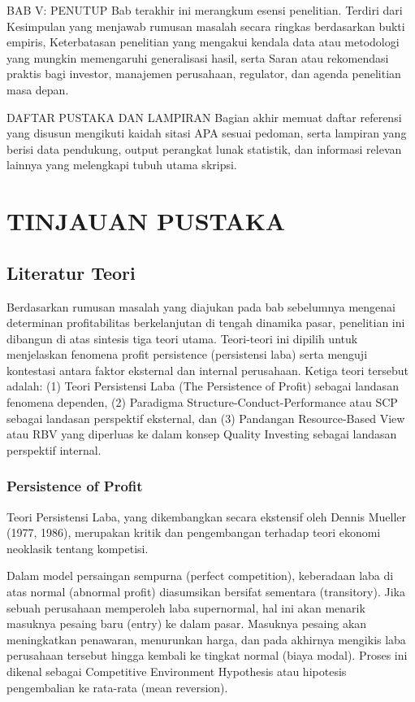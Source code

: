 \documentclass[12pt,a4paper]{report}
\begin{document}
BAB V: PENUTUP Bab terakhir ini merangkum esensi penelitian. Terdiri
dari Kesimpulan yang menjawab rumusan masalah secara ringkas berdasarkan
bukti empiris, Keterbatasan penelitian yang mengakui kendala data atau
metodologi yang mungkin memengaruhi generalisasi hasil, serta Saran atau
rekomendasi praktis bagi investor, manajemen perusahaan, regulator, dan
agenda penelitian masa depan.

DAFTAR PUSTAKA DAN LAMPIRAN Bagian akhir memuat daftar referensi yang
disusun mengikuti kaidah sitasi APA sesuai pedoman, serta lampiran yang
berisi data pendukung, output perangkat lunak statistik, dan informasi
relevan lainnya yang melengkapi tubuh utama skripsi.

\hypertarget{tinjauan-pustaka}{%
\chapter{TINJAUAN PUSTAKA}\label{tinjauan-pustaka}}

\hypertarget{literatur-teori}{%
\section{Literatur Teori}\label{literatur-teori}}

Berdasarkan rumusan masalah yang diajukan pada bab sebelumnya mengenai
determinan profitabilitas berkelanjutan di tengah dinamika pasar,
penelitian ini dibangun di atas sintesis tiga teori utama. Teori-teori
ini dipilih untuk menjelaskan fenomena profit persistence (persistensi
laba) serta menguji kontestasi antara faktor eksternal dan internal
perusahaan. Ketiga teori tersebut adalah: (1) Teori Persistensi Laba
(The Persistence of Profit) sebagai landasan fenomena dependen, (2)
Paradigma Structure-Conduct-Performance atau SCP sebagai landasan
perspektif eksternal, dan (3) Pandangan Resource-Based View atau RBV
yang diperluas ke dalam konsep Quality Investing sebagai landasan
perspektif internal.

\hypertarget{persistence-of-profit}{%
\subsection{Persistence of Profit}\label{persistence-of-profit}}

Teori Persistensi Laba, yang dikembangkan secara ekstensif oleh Dennis
Mueller (1977, 1986), merupakan kritik dan pengembangan terhadap teori
ekonomi neoklasik tentang kompetisi.

Dalam model persaingan sempurna (perfect competition), keberadaan laba
di atas normal (abnormal profit) diasumsikan bersifat sementara
(transitory). Jika sebuah perusahaan memperoleh laba supernormal, hal
ini akan menarik masuknya pesaing baru (entry) ke dalam pasar. Masuknya
pesaing akan meningkatkan penawaran, menurunkan harga, dan pada akhirnya
mengikis laba perusahaan tersebut hingga kembali ke tingkat normal
(biaya modal). Proses ini dikenal sebagai Competitive Environment
Hypothesis atau hipotesis pengembalian ke rata-rata (mean reversion).
\end{document}
